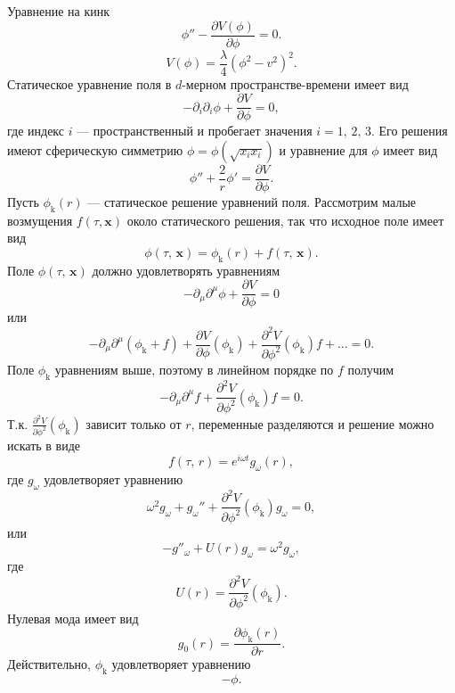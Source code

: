 \documentclass[a4paper]{article}
\begin{document}
\begin{sol}
Уравнение на кинк
\[
	\phi''- \frac{\partial V(\phi)}{\partial \phi} =0
.\] 
\[
	V(\phi)= \frac{\lambda}{4}(\phi^2-v^2)^2
.\] 
Статическое уравнение поля в $d$-мерном пространстве-времени
имеет вид
\[
-\partial_i \partial_i \phi + \frac{\partial V}{\partial \phi} =0
,\] 
где индекс $i$ --- пространственный и пробегает значения 
$i=1,\,2,\,3$. Его решения имеют сферическую симметрию
$\phi=\phi\left( \sqrt{x_ix_i}  \right) $ и уравнение для
$\phi$ имеет вид
\[
\phi''+ \frac{2}{r}\phi'= \frac{\partial V}{\partial \phi} 
.\] 
Пусть $\phi_\text{k}(r)$ --- статическое решение уравнений поля.
Рассмотрим малые возмущения $f(\tau,\mathbf{x})$ около статического
решения, так что исходное поле имеет вид
\[
	\phi(\tau,\,\mathbf{x})=\phi_\text{k}(r)+f(\tau,\,\mathbf{x})
.\] 
Поле $\phi(\tau,\,\mathbf{x})$ должно удовлетворять уравнениям
\[
	-\partial_\mu \partial^\mu \phi+ \frac{\partial V}{\partial \phi}  =0
\]
или
\[
	-\partial_\mu\partial^\mu(\phi_\text{k}+f)+
	\frac{\partial V}{\partial \phi} (\phi_\text{k})+
	\frac{\partial^2 V}{\partial \phi^2} (\phi_\text{k})
	f+\ldots=0
.\] 
Поле $\phi_\text{k}$ уравнениям выше,
поэтому в линейном порядке по $f$ получим
\[
	-\partial_\mu \partial^\mu f+ \frac{\partial ^2 V}{\partial \phi^2} (\phi_\text{k})f=0
.\] 
Т.\:к. $\frac{\partial ^2 V}{\partial \phi^2} (\phi_\text{k})$
зависит только от $r$, переменные разделяются и решение можно
искать в виде
\[
	f(\tau,\,r)= e^{i\omega t}g_\omega (r)
 ,\]
где $g_\omega$ удовлетворяет уравнению
\[
\omega^2 g_\omega+ g_\omega''+ \frac{\partial ^2V}{\partial \phi^2} 
(\phi_\text{k})g_\omega=0
 ,\] 
или
\[
	-g''_\omega +U(r)g_\omega=\omega^2 g_\omega
 ,\]
где
\[
	U(r)= \frac{\partial ^2 V}{\partial \phi^2} (\phi_\text{k})
.\] 
Нулевая мода имеет вид
\[
	g_0(r)= \frac{\partial \phi_\text{k}(r)}{\partial r} 
.\] 
Действительно, $\phi_\text{k}$ удовлетворяет уравнению
\[
-\phi
.\] 
\end{sol}
\end{document}
